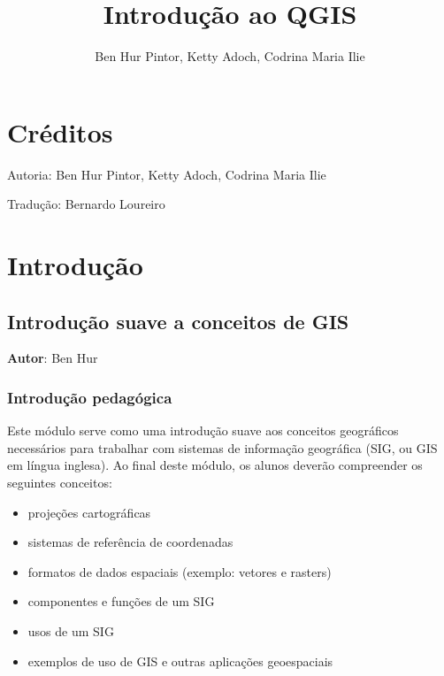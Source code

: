 \documentclass[
]{book}
\title{Introdução ao QGIS}
\author{Ben Hur Pintor, Ketty Adoch, Codrina Maria Ilie}
\date{}
\providecommand{\tightlist}{%
  \setlength{\itemsep}{0pt}\setlength{\parskip}{0pt}}
\begin{document}
\maketitle

{
\setcounter{tocdepth}{1}
\tableofcontents
}
\hypertarget{cruxe9ditos}{%
\chapter{Créditos}\label{cruxe9ditos}}

Autoria: Ben Hur Pintor, Ketty Adoch, Codrina Maria Ilie

Tradução: Bernardo Loureiro

\hypertarget{introduuxe7uxe3o}{%
\chapter{Introdução}\label{introduuxe7uxe3o}}

\hypertarget{introduuxe7uxe3o-suave-a-conceitos-de-gis}{%
\section{Introdução suave a conceitos de GIS}\label{introduuxe7uxe3o-suave-a-conceitos-de-gis}}

\textbf{Autor}: Ben Hur

\hypertarget{introduuxe7uxe3o-pedaguxf3gica}{%
\subsection{Introdução pedagógica}\label{introduuxe7uxe3o-pedaguxf3gica}}

Este módulo serve como uma introdução suave aos conceitos geográficos necessários para trabalhar com sistemas de informação geográfica (SIG, ou GIS em língua inglesa). Ao final deste módulo, os alunos deverão compreender os seguintes conceitos:

\begin{itemize}
\tightlist
\item
  projeções cartográficas
\item
  sistemas de referência de coordenadas
\item
  formatos de dados espaciais (exemplo: vetores e rasters)
\item
  componentes e funções de um SIG
\item
  usos de um SIG
\item
  exemplos de uso de GIS e outras aplicações geoespaciais
\end{itemize}
\end{document}
